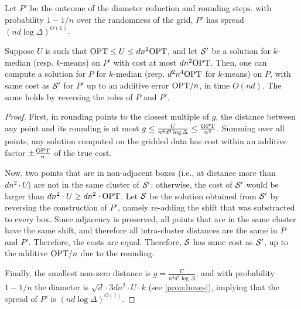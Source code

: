 \begin{lemma}\label{lem:reduceSpread}
Let $P'$ be the outcome of the diameter reduction and rounding steps. with probability $1-1/n$ over the randomness of the grid, $P'$ has spread $(nd \log \Delta)^{O(1)}$.

Suppose $U$ is such that $\text{OPT} \leq U \leq d n^2  \text{OPT}$, and 
let $\mathcal S'$ be a solution for  $k$-median (resp. $k$-means) on $P'$ with cost at most $d n^2 \text{OPT}$. 
Then, one can compute a solution for $P$ for $k$-median (resp. $d^2 n^4 \text{OPT}$ for $k$-means) on $P$, with same cost as $\mathcal S'$ for $P'$ up to an additive error $\text{OPT} / n$, in time $O(nd)$. The same holds by reversing the roles of $P$ and $P'$.
\end{lemma}
\begin{proof}
First, in rounding points to the closest multiple of $g$,
  the distance between any point and its rounding is at most $g \leq \frac{U}{n^4 d^2 \log \Delta} \leq \frac{\text{OPT}}{n^2}$. Summing over all points,
any solution computed on the gridded data has cost within an additive factor $\pm \frac{\text{OPT}}{n}$ of the true cost. 

Now, two points that are in non-adjacent boxes
(i.e., at distance more than $d n^2\cdot U$) are not in the same cluster of $\mathcal S'$: otherwise, the cost of $\mathcal S'$ would be larger than $d n^2\cdot U \geq d n^2\cdot \text{OPT}$. 
 Let $\mathcal S$ be
the solution obtained from $\mathcal S'$ by reversing the construction of $P'$, namely re-adding the shift that was substracted to every box. Since adjacency is preserved, all points that are in the same cluster have the same shift, and therefore all
intra-cluster distances are the same in $P$ and $P'$. Therefore, the costs are equal. Therefore, $\mathcal S$ has same cost as $\mathcal S'$, up to the additive $\text{OPT} /n$ due to the rounding.

Finally, the smallest
non-zero distance is $g = \frac{U}{n^4 d^{2} \log \Delta}$, and with probability $1-1/n$ the diameter is $\sqrt{d} \cdot 3d n^2\cdot U \cdot k$ (see \cref{prop:boxes}), implying that the spread of $P'$ is $(nd \log \Delta)^{O(1)}$.
\end{proof}




